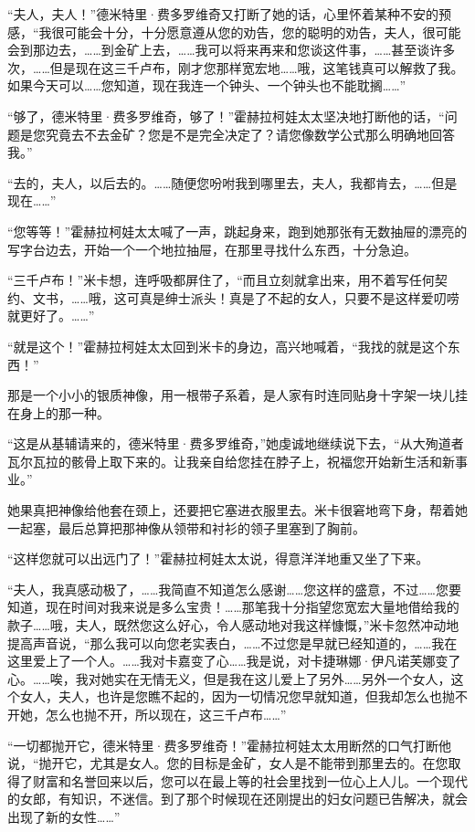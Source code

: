\par “夫人，夫人！”德米特里·费多罗维奇又打断了她的话，心里怀着某种不安的预感，“我很可能会十分，十分愿意遵从您的劝告，您的聪明的劝告，夫人，很可能会到那边去，……到金矿上去，……我可以将来再来和您谈这件事，……甚至谈许多次，……但是现在这三千卢布，刚才您那样宽宏地……哦，这笔钱真可以解救了我。如果今天可以……您知道，现在我连一个钟头、一个钟头也不能耽搁……”
\par “够了，德米特里·费多罗维奇，够了！”霍赫拉柯娃太太坚决地打断他的话，“问题是您究竟去不去金矿？您是不是完全决定了？请您像数学公式那么明确地回答我。”
\par “去的，夫人，以后去的。……随便您吩咐我到哪里去，夫人，我都肯去，……但是现在……”
\par “您等等！”霍赫拉柯娃太太喊了一声，跳起身来，跑到她那张有无数抽屉的漂亮的写字台边去，开始一个一个地拉抽屉，在那里寻找什么东西，十分急迫。
\par “三千卢布！”米卡想，连呼吸都屏住了，“而且立刻就拿出来，用不着写任何契约、文书，……哦，这可真是绅士派头！真是了不起的女人，只要不是这样爱叨唠就更好了。……”
\par “就是这个！”霍赫拉柯娃太太回到米卡的身边，高兴地喊着，“我找的就是这个东西！”
\par 那是一个小小的银质神像，用一根带子系着，是人家有时连同贴身十字架一块儿挂在身上的那一种。
\par “这是从基辅请来的，德米特里·费多罗维奇，”她虔诚地继续说下去，“从大殉道者瓦尔瓦拉的骸骨上取下来的。让我亲自给您挂在脖子上，祝福您开始新生活和新事业。”
\par 她果真把神像给他套在颈上，还要把它塞进衣服里去。米卡很窘地弯下身，帮着她一起塞，最后总算把那神像从领带和衬衫的领子里塞到了胸前。
\par “这样您就可以出远门了！”霍赫拉柯娃太太说，得意洋洋地重又坐了下来。
\par “夫人，我真感动极了，……我简直不知道怎么感谢……您这样的盛意，不过……您要知道，现在时间对我来说是多么宝贵！……那笔我十分指望您宽宏大量地借给我的款子……哦，夫人，既然您这么好心，令人感动地对我这样慷慨，”米卡忽然冲动地提高声音说，“那么我可以向您老实表白，……不过您是早就已经知道的，……我在这里爱上了一个人。……我对卡嘉变了心……我是说，对卡捷琳娜·伊凡诺芙娜变了心。……唉，我对她实在无情无义，但是我在这儿爱上了另外……另外一个女人，这个女人，夫人，也许是您瞧不起的，因为一切情况您早就知道，但我却怎么也抛不开她，怎么也抛不开，所以现在，这三千卢布……”
\par “一切都抛开它，德米特里·费多罗维奇！”霍赫拉柯娃太太用断然的口气打断他说，“抛开它，尤其是女人。您的目标是金矿，女人是不能带到那里去的。在您取得了财富和名誉回来以后，您可以在最上等的社会里找到一位心上人儿。一个现代的女郎，有知识，不迷信。到了那个时候现在还刚提出的妇女问题已告解决，就会出现了新的女性……”
